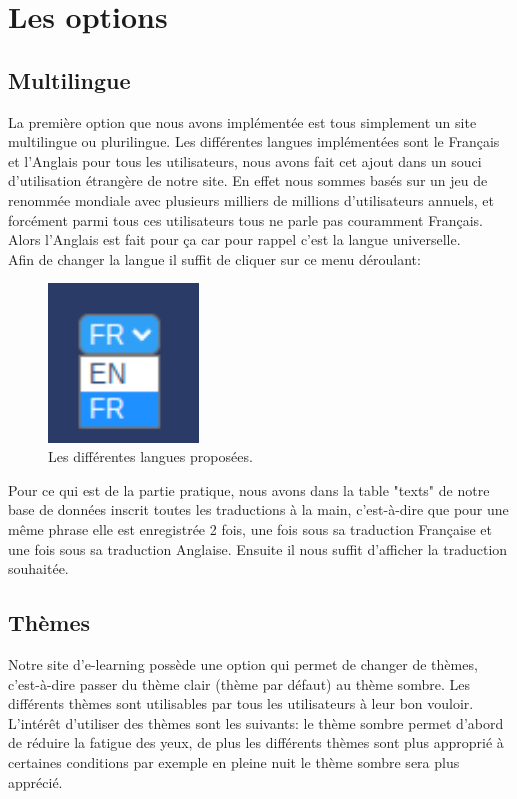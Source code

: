 \documentclass[a4paper,10pt]{article}
\begin{document}
\section{Les options}
\subsection{Multilingue}
La première option que nous avons implémentée est tous simplement un site multilingue ou plurilingue. Les différentes langues implémentées sont le Français et l'Anglais pour tous les utilisateurs, nous avons fait cet ajout dans un souci d'utilisation étrangère de notre site. En effet nous sommes basés sur un jeu de renommée mondiale avec plusieurs milliers de millions d'utilisateurs annuels, et forcément parmi tous ces utilisateurs tous ne parle pas couramment Français. Alors l'Anglais est fait pour ça car pour rappel c'est la langue universelle.\\

Afin de changer la langue il suffit de cliquer sur ce menu déroulant:
\begin{figure}[!h]
\centerline{\includegraphics[width=4cm]{images/menuLangues.PNG}}
\caption{Les différentes langues proposées.}
\label{fig}
\end{figure}

Pour ce qui est de la partie pratique, nous avons dans la table "texts" de notre base de données inscrit toutes les traductions à la main, c'est-à-dire que pour une même phrase elle est enregistrée 2 fois, une fois sous sa traduction Française et une fois sous sa traduction Anglaise. Ensuite il nous suffit d'afficher la traduction souhaitée.

\subsection{Thèmes}
Notre site d'e-learning possède une option qui permet de changer de thèmes, c'est-à-dire passer du thème clair (thème par défaut) au thème sombre. Les différents thèmes sont utilisables par tous les utilisateurs à leur bon vouloir. L'intérêt d'utiliser des thèmes sont les suivants: le thème sombre permet d’abord de réduire la fatigue des yeux, de plus les différents thèmes sont plus approprié à certaines conditions par exemple en pleine nuit le thème sombre sera plus apprécié.\\
\end{document}
